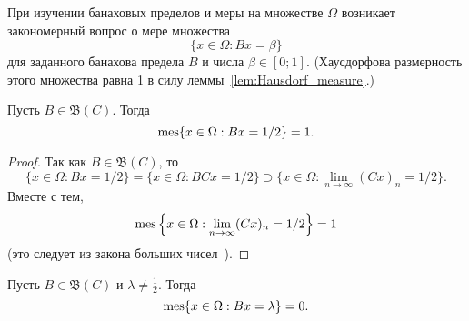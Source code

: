 При изучении банаховых пределов и меры на множестве $\Omega$
возникает закономерный вопрос о мере множества
\begin{equation}
	\{ x \in \Omega : Bx = \beta \}
\end{equation}
для заданного банахова предела $B$ и числа $\beta\in[0;1]$.
(Хаусдорфова размерность этого множества равна 1 в силу леммы~\ref{lem:Hausdorf_measure}.)

\begin{theorem}
	Пусть $B \in \mathfrak{B}(C)$.
	Тогда
	\begin{equation}
		\operatorname{mes} \{ x \in \Omega : Bx = 1/2 \} = 1
		.
	\end{equation}
\end{theorem}

\begin{proof}
	Так как $B \in \mathfrak{B}(C)$, то
	\begin{equation}
		\{ x \in \Omega : Bx = 1/2 \}
		=
		\{ x \in \Omega : BCx = 1/2 \}
		\supset
		\{ x \in \Omega : \lim_{n\to\infty} (Cx)_n = 1/2 \}
		.
	\end{equation}
	Вместе с тем,
	\begin{equation}
		\operatorname{mes} \left\{ x \in \Omega : \lim_{n\to\infty} (Cx)_n  = 1/2 \right\} = 1
	\end{equation}
	(это следует из закона больших чисел~\cite{connor1990almost}).
\end{proof}

\begin{corollary}
	Пусть $B \in \mathfrak{B}(C)$ и $\lambda \ne \frac 1 2$. Тогда
	\begin{equation}
		\operatorname{mes} \{ x \in \Omega : Bx = \lambda \} = 0
		.
	\end{equation}
\end{corollary}

